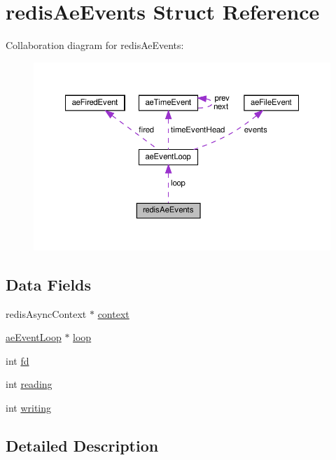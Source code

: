 \hypertarget{structredis_ae_events}{}\section{redis\+Ae\+Events Struct Reference}
\label{structredis_ae_events}


Collaboration diagram for redis\+Ae\+Events\+:
\nopagebreak
\begin{figure}[H]
\begin{center}
\leavevmode
\includegraphics[width=350pt]{structredis_ae_events__coll__graph}
\end{center}
\end{figure}
\subsection*{Data Fields}
\begin{DoxyCompactItemize}
\item 
redis\+Async\+Context $\ast$ \hyperlink{structredis_ae_events_a5764ffeda6751a7e3eec0eb29d402bde}{context}
\item 
\hyperlink{structae_event_loop}{ae\+Event\+Loop} $\ast$ \hyperlink{structredis_ae_events_ae87889ddc12a87da6155fdeadaf2c604}{loop}
\item 
int \hyperlink{structredis_ae_events_a6f8059414f0228f0256115e024eeed4b}{fd}
\item 
int \hyperlink{structredis_ae_events_a5fa8d7fdcda2ed9555ad800a40a1a810}{reading}
\item 
int \hyperlink{structredis_ae_events_adb2dbc8c43288a024535ed507da7b278}{writing}
\end{DoxyCompactItemize}


\subsection{Detailed Description}


